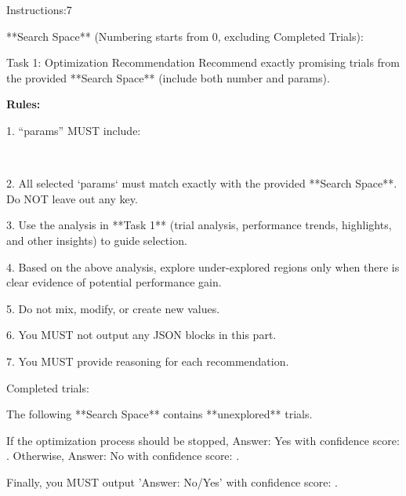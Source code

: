\begin{tcolorbox}[breakable,colback=orange!5!white, colframe=black, title={Search Prompt of LLM solver}]
Instructions:7

**Search Space** (Numbering starts from 0, excluding Completed Trials):
    
Task 1: Optimization Recommendation
Recommend exactly  promising trials from the provided **Search Space** (include both number and params).

\textbf{Rules:}

1. ``params'' MUST include:

\,\,

2. All selected `params` must match exactly with the provided **Search Space**. Do NOT leave out any key.

3. Use the analysis in **Task 1** (trial analysis, performance trends, highlights, and other insights) to guide selection.

4. Based on the above analysis, explore under-explored regions only when there is clear evidence of potential performance gain.

5. Do not mix, modify, or create new values.

6. You MUST not output any JSON blocks in this part.

7. You MUST provide reasoning for each recommendation.
\end{tcolorbox}

\begin{tcolorbox}[breakable,colback=orange!5!white, colframe=black, title={Early-Stopping Prompt of LLM-ES solver}]
Completed trials:

The following **Search Space** contains **unexplored** trials.

If the optimization process should be stopped, Answer: Yes with confidence score: . Otherwise, Answer: No with confidence score: .

Finally, you MUST output 'Answer: No/Yes' with confidence score: .
\end{tcolorbox}